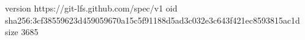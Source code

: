 version https://git-lfs.github.com/spec/v1
oid sha256:3cf38559623d459059670a15c5f91188d5ad3c032e3c643f421ec8593815ac1d
size 3685
